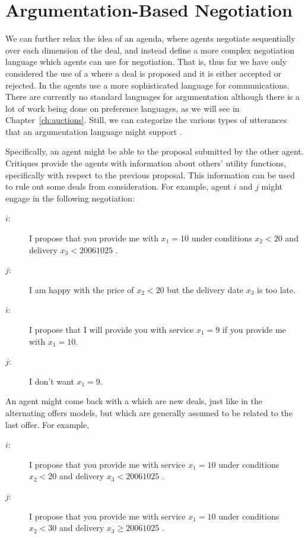 \section{Argumentation-Based Negotiation}
\label{sec:argumentation}

We can further relax the idea of an agenda, where agents negotiate
sequentially over each dimension of the deal, and instead define a
more complex negotiation language which agents can use for
negotiation. That is, thus far we have only considered the use of a
 where a deal is proposed and it is either
accepted or rejected. In  the agents use
a more sophisticated language for communications. There are currently
no standard languages for argumentation although there is a lot of
work being done on preference languages, as we will see in
Chapter~\ref{ch:auctions}. Still, we can categorize the various types
of utterances that an argumentation language might support
\cite{jennings01a}.

Specifically, an agent might be able to  the proposal
submitted by the other agent. Critiques provide the agents with
information about others' utility functions, specifically with respect
to the previous proposal. This information can be used to rule out
some deals from consideration. For example,  agent $i$ and $j$ might
engage in the following negotiation:
\begin{description}
\item[$i$:]I propose that you provide me with $x_1 = 10$ under
  conditions $x_2 < 20$ and delivery $x_3 < 20061025$ .

\item[$j$:]I am happy with the price of $x_2 < 20$ but the delivery
  date $x_3$ is too late.

\item[$i$:]I propose that I will provide you with service $x_1 = 9$ if
  you provide me with $x_1 = 10$.

\item[$j$:] I don't want $x_1 = 9$.
\end{description}

An agent might come back with a  which are new
deals, just like in the alternating offers models, but which are
generally assumed to be related to the last offer. For example,

\begin{description}
\item[$i$:] I propose that you provide me with service $x_1 = 10$
  under conditions $x_2 < 20$ and delivery $x_3 < 20061025$ .

\item[$j$:] I propose that you provide me with service $x_1 = 10$
  under conditions $x_2 < 30$ and delivery $x_3 \geq 20061025$ .

\end{description}

